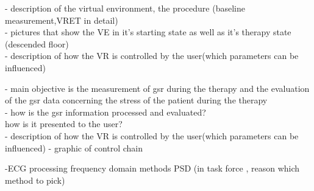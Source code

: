 - description of the virtual environment, the procedure (baseline measurement,VRET in detail)\\ 
- pictures that show the VE in it's starting state as well as it's therapy state (descended floor)\\
- description of how the VR is controlled by the user(which parameters can be influenced)

- main objective is the measurement of gsr during the therapy and the evaluation of the gsr data concerning the stress of the patient during the therapy\\
- how is the gsr information processed and evaluated?\\
how is it presented to the user?\\
- description of how the VR is controlled by the user(which parameters can be influenced)
- graphic of control chain




-ECG processing frequency domain methods PSD (in task force , reason which method to pick)